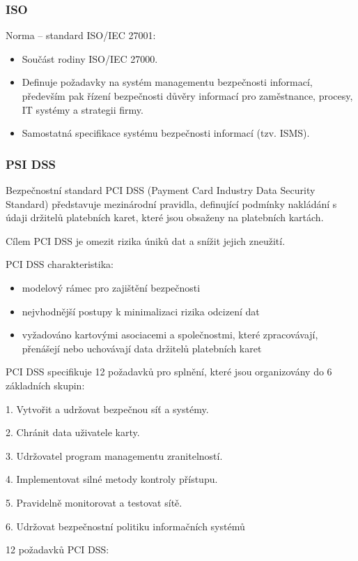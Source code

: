 \subsubsection{ISO}
Norma – standard ISO/IEC 27001:
\begin{itemize}
    \item Součást rodiny ISO/IEC 27000.
    \item Definuje požadavky na systém managementu bezpečnosti informací, především pak řízení bezpečnosti důvěry informací pro zaměstnance, procesy, IT systémy a strategii firmy.
    \item Samostatná specifikace systému bezpečnosti informací (tzv. ISMS).
\end{itemize}

\subsubsection{PSI DSS}
Bezpečnostní standard PCI DSS (Payment Card Industry Data Security Standard) představuje mezinárodní pravidla, definující podmínky nakládání s údaji držitelů platebních karet, které jsou obsaženy na platebních kartách.

Cílem PCI DSS je omezit rizika úniků dat a snížit jejich zneužití.

PCI DSS charakteristika:
\begin{itemize}
    \item modelový rámec pro zajištění bezpečnosti
    \item nejvhodnější postupy k minimalizaci rizika odcizení dat
    \item vyžadováno kartovými asociacemi a společnostmi, které zpracovávají, přenášejí nebo uchovávají data držitelů platebních karet
\end{itemize} 

PCI DSS specifikuje 12 požadavků pro splnění, které jsou organizovány do 6 základních skupin:

1. Vytvořit a udržovat bezpečnou síť a systémy.

2. Chránit data uživatele karty.

3. Udržovatel program managementu zranitelností.

4. Implementovat silné metody kontroly přístupu.

5. Pravidelně monitorovat a testovat sítě.

6. Udržovat bezpečnostní politiku informačních systémů

12 požadavků PCI DSS:

